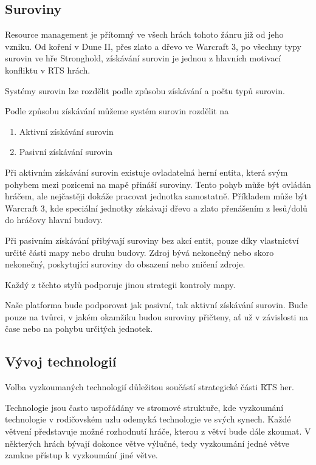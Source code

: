 \subsection{Suroviny}
Resource management je přítomný ve všech hrách tohoto žánru již od jeho vzniku. Od koření v Dune II, přes zlato a dřevo ve Warcraft 3, po všechny typy surovin ve hře Stronghold, získávání surovin je jednou z hlavních motivací konfliktu v RTS hrách. 

Systémy surovin lze rozdělit podle způsobu získávání a počtu typů surovin.

Podle způsobu získávání můžeme systém surovin rozdělit na
\begin{enumerate}
	\item Aktivní získávání surovin
	\item Pasivní získávání surovin
\end{enumerate}

Při aktivním získávání surovin existuje ovladatelná herní entita, která svým pohybem mezi pozicemi na mapě přináší suroviny. Tento pohyb může být ovládán hráčem, ale nejčastěji dokáže pracovat jednotka samostatně. Příkladem může být Warcraft 3, kde speciální jednotky získávají dřevo a zlato přenášením z lesů/dolů do hráčovy hlavní budovy.

Při pasivním získávání přibývají suroviny bez akcí entit, pouze díky vlastnictví určité části mapy nebo druhu budovy. Zdroj bývá nekonečný nebo skoro nekonečný, poskytující suroviny do obsazení nebo zničení zdroje.

Každý z těchto stylů podporuje jinou strategii kontroly mapy.

Naše platforma bude podporovat jak pasivní, tak aktivní získávání surovin. Bude pouze na tvůrci, v jakém okamžiku budou suroviny přičteny, ať už v závislosti na čase nebo na pohybu určitých jednotek. 

\subsection{Vývoj technologií}
Volba vyzkoumaných technologií důležitou součástí strategické části RTS her. 

Technologie jsou často uspořádány ve stromové struktuře, kde vyzkoumání technologie v rodičovském uzlu odemyká technologie ve svých synech. Každé větvení představuje možné rozhodnutí hráče, kterou z větví bude dále zkoumat. V některých hrách bývají dokonce větve výlučné, tedy vyzkoumání jedné větve zamkne přístup k vyzkoumání jiné větve.

